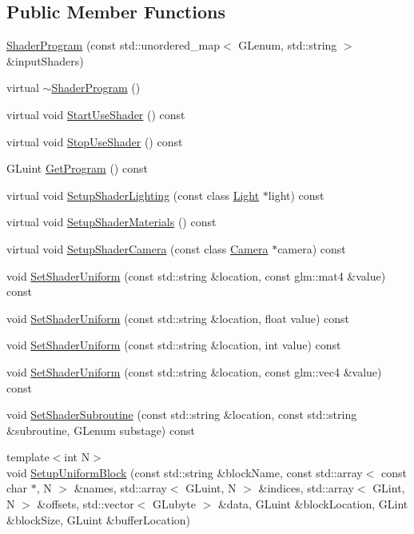 \subsection*{Public Member Functions}
\begin{DoxyCompactItemize}
\item 
\hyperlink{class_shader_program_aba2db5734b2f70cc34078126ad279588}{Shader\+Program} (const std\+::unordered\+\_\+map$<$ G\+Lenum, std\+::string $>$ \&input\+Shaders)
\item 
virtual \hyperlink{class_shader_program_a2d2eadcfc48cc2e2ddb82aba70553a9f}{$\sim$\+Shader\+Program} ()
\item 
virtual void \hyperlink{class_shader_program_a906b0232f27663b28cc800ac2851541f}{Start\+Use\+Shader} () const 
\item 
virtual void \hyperlink{class_shader_program_a5afb6f91d30b6e197fab0827c416c51f}{Stop\+Use\+Shader} () const 
\item 
G\+Luint \hyperlink{class_shader_program_a281396edbb786eacf86ae4997a3e90c6}{Get\+Program} () const 
\item 
virtual void \hyperlink{class_shader_program_a2f3c1c149aa0988e07e0a513c69c1770}{Setup\+Shader\+Lighting} (const class \hyperlink{class_light}{Light} $\ast$light) const 
\item 
virtual void \hyperlink{class_shader_program_ad7a595a10717c6051d6c582c850c4ed7}{Setup\+Shader\+Materials} () const 
\item 
virtual void \hyperlink{class_shader_program_a75e888f885b9028847e2d9556a754170}{Setup\+Shader\+Camera} (const class \hyperlink{class_camera}{Camera} $\ast$camera) const 
\item 
void \hyperlink{class_shader_program_a47298abb4ffc8d75f88b3d603aa989f9}{Set\+Shader\+Uniform} (const std\+::string \&location, const glm\+::mat4 \&value) const 
\item 
void \hyperlink{class_shader_program_a3a4c9cd6967787bded962acd7ce6b3c6}{Set\+Shader\+Uniform} (const std\+::string \&location, float value) const 
\item 
void \hyperlink{class_shader_program_a93e7090cc8ff284bfcde6ae972aa5b9e}{Set\+Shader\+Uniform} (const std\+::string \&location, int value) const 
\item 
void \hyperlink{class_shader_program_a08b8936758c067aad38e6cd94608663f}{Set\+Shader\+Uniform} (const std\+::string \&location, const glm\+::vec4 \&value) const 
\item 
void \hyperlink{class_shader_program_ae2e00fa2f9107b34c758996021574b15}{Set\+Shader\+Subroutine} (const std\+::string \&location, const std\+::string \&subroutine, G\+Lenum substage) const 
\item 
{\footnotesize template$<$int N$>$ }\\void \hyperlink{class_shader_program_a16169356d5ce43e64e6018ad5d79f594}{Setup\+Uniform\+Block} (const std\+::string \&block\+Name, const std\+::array$<$ const char $\ast$, N $>$ \&names, std\+::array$<$ G\+Luint, N $>$ \&indices, std\+::array$<$ G\+Lint, N $>$ \&offsets, std\+::vector$<$ G\+Lubyte $>$ \&data, G\+Luint \&block\+Location, G\+Lint \&block\+Size, G\+Luint \&buffer\+Location)
\end{DoxyCompactItemize}
